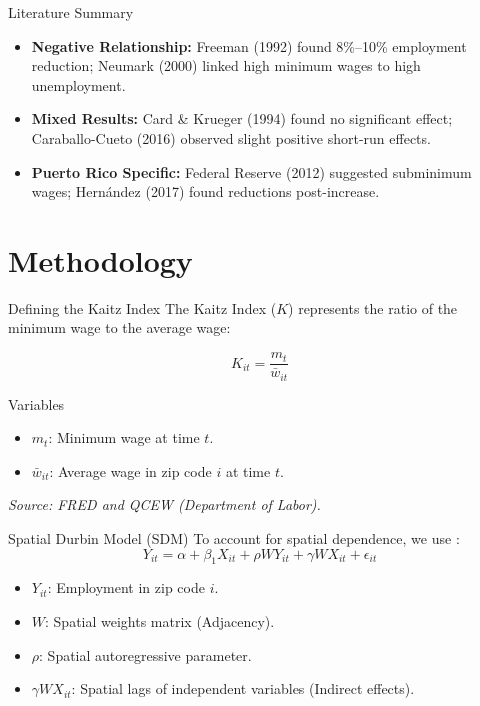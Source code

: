 \documentclass[11pt]{beamer}
\begin{document}
\begin{frame}{Literature Summary}
	\begin{itemize}
		\item \textbf{Negative Relationship:} Freeman (1992) \cite{castillo1992minimum} found 8\%--10\% employment reduction; Neumark (2000) \cite{neumark2000minimum} linked high minimum wages to high unemployment.
		\item \textbf{Mixed Results:} Card \& Krueger (1994) \cite{card1994comment} found no significant effect; Caraballo-Cueto (2016) \cite{caraballo2016there} observed slight positive short-run effects.
		\item \textbf{Puerto Rico Specific:} Federal Reserve (2012) \cite{torres2012competitividad} suggested subminimum wages; Hernández (2017) found reductions post-increase.
	\end{itemize}
\end{frame}

\section{Methodology}

\begin{frame}{Defining the Kaitz Index}
	The Kaitz Index ($K$) represents the ratio of the minimum wage to the average wage:

	\[
		K_{it} = \frac{m_t}{\bar{w}_{it}}
	\]

	\begin{block}{Variables}
		\begin{itemize}
			\item $m_t$: Minimum wage at time $t$.
			\item $\bar{w}_{it}$: Average wage in zip code $i$ at time $t$.
		\end{itemize}
	\end{block}
	\textit{Source: FRED and QCEW (Department of Labor).}
\end{frame}

\begin{frame}{Spatial Durbin Model (SDM)}
	To account for spatial dependence, we use \cite{lee2016identification}:
	\[
		Y_{it} = \alpha + \beta_1 X_{it} + \rho W Y_{it} + \gamma W X_{it} + \epsilon_{it}
	\]
	\begin{itemize}
		\item $Y_{it}$: Employment in zip code $i$.
		\item $W$: Spatial weights matrix (Adjacency).
		\item $\rho$: Spatial autoregressive parameter.
		\item $\gamma W X_{it}$: Spatial lags of independent variables (Indirect effects).
	\end{itemize}
\end{frame}
\end{document}
